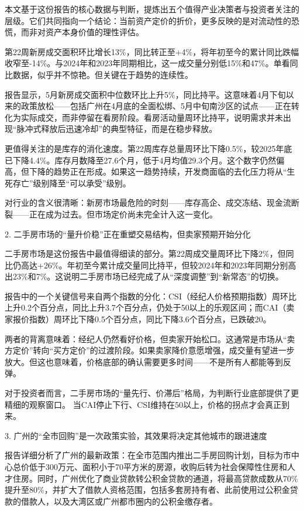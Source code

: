 \documentclass[11pt]{ctexart}
\begin{document}
本文基于这份报告的核心数据与判断，提炼出五个值得产业决策者与投资者关注的层级。它们共同指向一个结论：当前资产定价的折价，更多反映的是对流动性的恐慌，而非对资产本身价值的理性评估。

第22周新房成交面积环比增长13\%，同比转正至+4\%，将年初至今的累计同比跌幅收窄至-14\%。与2024年和2023年同期相比，这一成交量分别低15\%和47\%。单看同比数据，似乎并不惊艳。但关键在于趋势的连续性。

报告显示，5月新房成交面积中位数环比上升5\%，同比持平。这意味着4月下旬以来的政策放松——包括广州在4月底的全面松绑、5月中旬南沙区的试点——正在转化为实际成交，而非停留在看房阶段。看房活动量周环比持平，说明需求并未出现“脉冲式释放后迅速冷却”的典型特征，而是在稳步释放。

更值得关注的是库存的消化速度。第22周库存总量周环比下降0.5\%，较2025年底已下降4.4\%。库存月数降至27.6个月，低于4月均值29.3个月。这个数字仍然偏高，但下降的趋势正在形成。如果这一趋势持续，开发商面临的去化压力将从“生死存亡”级别降至“可以承受”级别。

对行业的含义很清晰：新房市场最危险的时刻——库存高企、成交冻结、现金流断裂——正在成为过去。但市场定价尚未完全计入这一变化。

2. 二手房市场的“量升价稳”正在重塑交易结构，但卖家预期开始分化

二手房市场是这份报告中最值得细读的部分。第22周成交量周环比下降2\%，但同比仍高达+26\%。年初至今累计成交量同比持平，但较2024年和2023年同期分别高出23\%和7\%。这说明二手房市场已经完成了从“深度调整”到“新常态”的切换。

报告中的一个关键信号来自两个指数的分化：CSI（经纪人价格预期指数）周环比上升0.2个百分点，同比上升3.7个百分点，仍处于50以上的乐观区间；而CAI（卖家报价指数）周环比下降0.5个百分点，同比下降3.6个百分点，已跌破20。

两者的背离意味着：经纪人仍然看好价格，但卖家开始松口。这通常是市场从“卖方定价”转向“买方定价”的过渡阶段。如果卖家降价意愿增强，成交量有望进一步放大。但这也意味着，价格底部的确认需要更多时间——不是所有人都能等到反弹。

对于投资者而言，二手房市场的“量先行、价滞后”格局，为判断行业底部提供了更精细的观察窗口。 当CAI停止下行、CSI维持在50以上，价格的拐点才会真正到来。

3. 广州的“全市回购”是一次政策实验，其效果将决定其他城市的跟进速度

报告详细分析了广州的最新政策：在全市范围内推出二手房回购计划，目标为市中心总价低于300万元、面积小于70平方米的房源，收购后转为社会保障性住房和人才住房。同时，广州优化了商业贷款转公积金贷款的通道，将最高贷款成数从70\%提升至80\%，并扩大了借款人资格范围，包括多套房持有者、此前使用过公积金贷款的借款人，以及大湾区或广州都市圈内的公积金缴存者。
\end{document}
